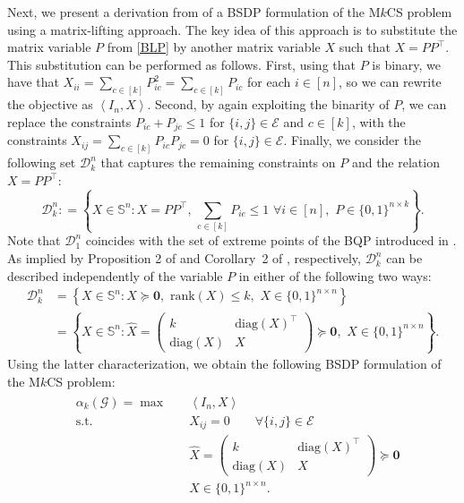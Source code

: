 \documentclass[11pt, a4paper]{article}
\newcommand{\diag}[1]{{\text{diag}\left(#1\right)}}
\newcommand{\rank}[1]{{\text{rank}\left(#1\right)}}
\newcommand{\IP}[2]{\left\langle #1, #2 \right\rangle}
\newcommand{\eqdef}{\mathrel{\mathop:}=}
\newcommand{\psd}{\succeq}
\newcommand{\mc}{\mathcal}
\newcommand{\aug}[1]{\hat{#1}}
\begin{document}
Next, we present a derivation from \cite{deMeijer2024BSDP} of a BSDP formulation of the M$k$CS problem using a matrix-lifting approach. 
The key idea of this approach is to substitute the matrix variable $P$ from \eqref{BLP} by another matrix variable $X$ such that $X = PP^\top$. 
This substitution can be performed as follows.
First, using that $P$ is binary, we have that $X_{ii} =\sum_{c \in [k]} P_{ic}^2 = \sum_{c \in [k]} P_{ic}$ for each $i \in [n]$, so we can rewrite the objective as $\IP{I_n}{X}$.
Second, by again exploiting the binarity of $P$, we can replace the constraints $P_{ic} + P_{jc} \leq 1$ for $\{i,j\} \in \mc{E}$ and $c \in [k]$, with the constraints $X_{ij} = \sum_{c \in [k]} P_{ic}P_{jc} = 0$ for $\{i,j\} \in \mc{E}$.
Finally, we consider the following set $\mc{D}^n_k$ that captures the remaining constraints on $P$ and the relation $X=PP^\top$:
\begin{equation}
    \mc{D}^n_k \eqdef \left\{X \in \mathbb{S}^n: X= PP^\top,\, \sum_{c \in [k]} P_{ic} \leq 1 \,\, \forall i \in [n], \,\, P \in \{0,1\}^{n \times k}\right\}. \label{BQP characterization 1}  
\end{equation}
Note that $\mc{D}^n_1$ coincides with the set of extreme points of the BQP introduced in \citep{Padberg1989BQP}.
As implied by Proposition 2 of \cite{Letchford2012BinarySDPMatrices} and Corollary~2 of \cite{deMeijer2024BSDP}, respectively, $\mc{D}^n_k$ can be described independently of the variable $P$ in either of the following two ways:
\begin{align}
    \mc{D}^n_k &= \left\{X \in \mathbb{S}^n: X \psd \textbf{0}, \,\,\rank{X} \leq k, \,\, X \in \{0,1\}^{n \times n}\right\} \label{BQP characterization 2}\\ 
    &= \left\{X \in \mathbb{S}^n: \aug{X} = \begin{pmatrix} k & \diag{X}^\top \\ \diag{X} & X \end{pmatrix} \psd \textbf{0}, \,\, X \in \{0,1\}^{n \times n}\right\}.  \label{BQP characterization 3}
\end{align}
Using the latter characterization, we obtain the following BSDP formulation of the M$k$CS problem:
\begin{align} \tag{BSDP$_k$} \label{BSDP} &\begin{aligned}
    \alpha_k(\mc{G}) = \max \quad & \IP{I_n}{X} \\
    \text{s.t.} \quad & X_{ij} = 0 \qquad \forall \{i,j\} \in \mc{E} \\
    & \aug{X} = \begin{pmatrix} k & \diag{X}^\top \\ \diag{X} & X \end{pmatrix} \psd \textbf{0} \\
    & X \in \{0,1\}^{n \times n}.
\end{aligned} \end{align}
\end{document}
